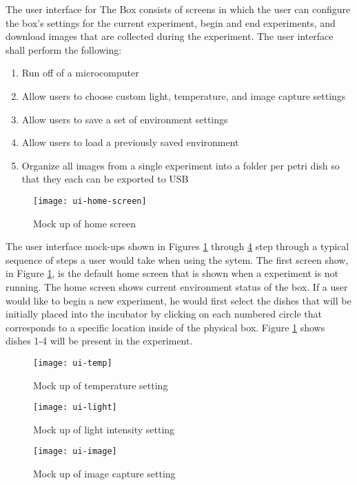 The user interface for The Box consists of screens in which the user can configure the box’s settings for the current experiment, begin and end experiments, and download images that are collected during the experiment. The user interface shall perform the following: 

\begin{enumerate}
	\item	Run off of a microcomputer
	\item	Allow users to choose custom light, temperature, and image capture settings
	\item   Allow users to save a set of environment settings
	\item	Allow users to load a previously saved environment 
	\item	Organize all images from a single experiment into a folder per petri dish so that they each can be exported to USB 

\end{enumerate}

\begin{figure}[H]
\texttt{[image: ui-home-screen]}
\caption{\label{figure:ui-home} Mock up of home screen}
\end{figure}

The user interface mock-ups shown in Figures \ref{figure:ui-home} through \ref{figure:ui-image} step through a typical sequence of steps a user would take when using the sytem. The first screen show, in Figure \ref{figure:ui-home}, is the default home screen that is shown when a experiment is not running. The home screen shows current environment status of the box. If a user would like to begin a new experiment, he would first select the dishes that will be initially placed into the incubator by clicking on each numbered circle that corresponds to a specific location inside of the physical box. Figure \ref{figure:ui-home} shows dishes 1-4 will be present in the experiment. 

\begin{figure}[H]
\texttt{[image: ui-temp]}
\caption{\label{figure:ui-temp} Mock up of temperature setting}

\end{figure}

\begin{figure}[H]
\texttt{[image: ui-light]}
\caption{\label{figure:ui-light} Mock up of light intensity setting}
\end{figure}

\begin{figure}[H]
\texttt{[image: ui-image]}
\caption{\label{figure:ui-image} Mock up of image capture setting}
\end{figure}


